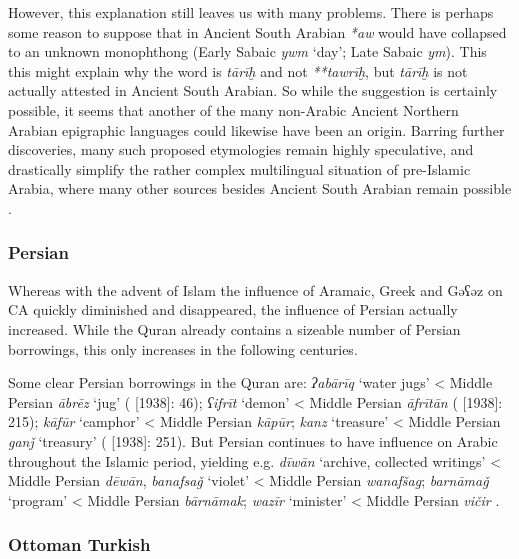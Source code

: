 \documentclass[output=paper]{langsci/langscibook}
\begin{document}
However, this explanation still leaves us with many problems. There is perhaps some reason to suppose that in Ancient South Arabian \textit{*aw} would have collapsed to an unknown monophthong (Early Sabaic \textit{ywm} ‘day’; Late Sabaic \textit{ym}). This this might explain why the word is \textit{tārīḫ} and not \textit{**tawrīḫ}, but \textit{tārīḫ} is not actually attested in Ancient South Arabian. So while the suggestion is certainly possible, it seems that another of the many non-Arabic Ancient Northern Arabian epigraphic languages could likewise have been an origin. Barring further discoveries, many such proposed etymologies remain highly speculative, and drastically simplify the rather complex multilingual situation of pre-Islamic Arabia, where many other sources besides Ancient South Arabian remain possible \citep{Al-Jallad2018ANA}.

\subsubsection{\label{bkm:Ref13224492}Persian}

Whereas with the advent of Islam the influence of Aramaic, Greek and Gəʕəz on CA quickly diminished and disappeared, the influence of Persian actually increased. While the Quran already contains a sizeable number of Persian borrowings, this only increases in the following centuries.

Some clear Persian borrowings in the Quran are: \textit{ʔabārīq} ‘water jugs’ < Middle Persian \textit{ābrēz} ‘jug’ (\citealt{Jeffrey2007} [1938]: 46); \textit{ʕifrīt} ‘demon’ < Middle Persian \textit{āfrītān} (\citealt{Jeffrey2007} [1938]: 215); \textit{kāfūr} ‘camphor’ < Middle Persian \textit{kāpūr}; \textit{kanz} ‘treasure’ < Middle Persian \textit{ganǰ} ‘treasury’ (\citealt{Jeffrey2007} [1938]: 251). But Persian continues to have influence on Arabic throughout the Islamic period, yielding e.g. \textit{dīwān} ‘archive, collected writings’ < Middle Persian \textit{dēwān}, \textit{banafsaǧ} ‘violet’ < Middle Persian \textit{wanafšag}; \textit{barnāmaǧ} ‘program’ < Middle Persian \textit{bārnāmak}; \textit{wazīr} ‘minister’ < Middle Persian \textit{vičir} \citep{Asbaghi2011}.

\subsubsection{\label{bkm:Ref13483797}Ottoman Turkish}
\end{document}
